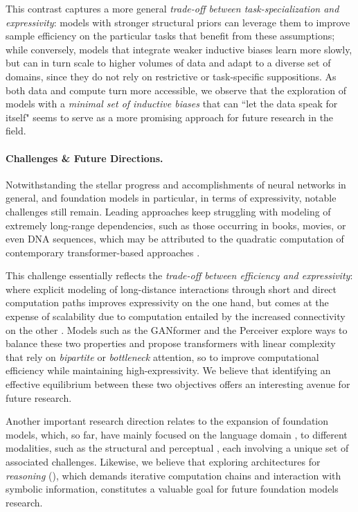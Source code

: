 This contrast captures a more general \textit{trade-off between task-specialization and expressivity}: models with stronger structural priors can leverage them to improve sample efficiency on the particular tasks that benefit from these assumptions; while conversely, models that integrate weaker inductive biases learn more slowly, but can in turn scale to higher volumes of data and adapt to a diverse set of domains, since they do not rely on restrictive or task-specific suppositions. As both data and compute turn more accessible, we observe that the exploration of models with a \textit{minimal set of inductive biases} that can ``let the data speak for itself" seems to serve as a more promising approach for future research in the field.

\paragraph{Challenges \& Future Directions.} Notwithstanding the stellar progress and accomplishments of neural networks in general, and foundation models in particular, in terms of expressivity, notable challenges still remain. Leading approaches \citep{performer,visual_transformer} keep struggling with modeling of extremely long-range dependencies, such as those occurring in books, movies, or even DNA sequences, which may be attributed to the quadratic computation of contemporary transformer-based approaches \citep{wang2020linformer,lin-et-al-2021-naacl}. 

This challenge essentially reflects the \textit{trade-off between efficiency and expressivity}: where explicit modeling of long-distance interactions through short and direct computation paths improves expressivity on the one hand, but comes at the expense of scalability due to computation entailed by the increased connectivity on the other \citep{child2019generating,kitaev2020reformer,performer}. Models such as the GANformer \citep{ganformer} and the Perceiver \citep{jaegle2021perceiver,jaegle2021perceiverio} explore ways to balance these two properties and propose transformers with linear complexity that rely on \textit{bipartite} or \textit{bottleneck} attention, so to improve computational efficiency while maintaining high-expressivity. We believe that identifying an effective equilibrium between these two objectives offers an interesting avenue for future research.

Another important research direction relates to the expansion of foundation models, which, so far, have mainly focused on the language domain \citep{peters2018elmo,devlin2019bert,brown2020gpt3}, to different modalities, such as the structural \citep{gnn,gat} and perceptual \citep{tolstikhin2021mlpmixer,jaegle2021perceiver,dosovitskiy2021ima}, each involving a unique set of associated challenges. Likewise, we believe that exploring architectures for \textit{reasoning} (), which demands iterative computation chains and interaction with symbolic information, constitutes a valuable goal for future foundation models research.
 
